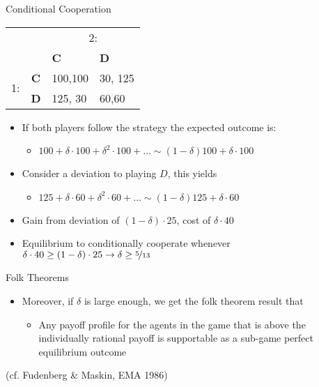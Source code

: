 \documentclass{beamer}
\begin{document}
\begin{frame}{Conditional Cooperation}
\begin{center}
\begin{tabular}{cc|p{}|p{}|}
 & \multicolumn{1}{c}{} & \multicolumn{2}{c}{2:}\\
 & \multicolumn{1}{c}{} & \multicolumn{1}{p{0.14\textwidth}}{\textbf{C}} & \multicolumn{1}{p{0.14\textwidth}}{\textbf{D}}\\
\cline{3-4}
\multirow{2}{*}{1:} & \textbf{C} & 100,100 & 30, 125\\
\cline{3-4}
 & \textbf{D} & 125, 30 & 60,60\\
\cline{3-4}
\end{tabular}
\par\end{center}
\begin{itemize}
\item If both players follow the strategy the expected outcome is:

\begin{itemize}
\item $100+\delta\cdot100+\delta^{2}\cdot100+\ldots\sim(1-\delta)100+\delta\cdot100$\pause
\end{itemize}
\item Consider a deviation to playing $D$, this yields

\begin{itemize}
\item $125+\delta\cdot60+\delta^{2}\cdot60+\ldots\sim(1-\delta)125+\delta\cdot60$\pause
\end{itemize}
\item Gain from deviation of $(1-\delta)\cdot25$, cost of $\delta\cdot40$
\item Equilibrium to conditionally cooperate whenever $\delta\cdot40\geq(1-\delta)\cdot25\rightarrow\delta\geq\nicefrac{5}{13}$
\end{itemize}
\end{frame}\begin{frame}{Folk Theorems}
\begin{itemize}
\item Moreover, if $\delta$ is large enough, we get the folk theorem result
that

\begin{itemize}
\item Any payoff profile for the agents in the game that is above the individually
rational payoff is supportable as a sub-game perfect equilibrium outcome
\end{itemize}
\end{itemize}
(cf. Fudenberg \& Maskin, EMA 1986)

\end{frame}
\end{document}
